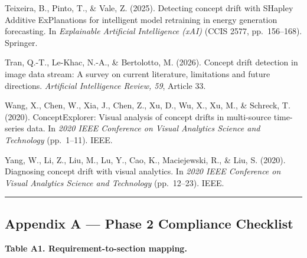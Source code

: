 \documentclass[
]{article}
\begin{document}
Teixeira, B., Pinto, T., \& Vale, Z. (2025). Detecting concept drift
with SHapley Additive ExPlanations for intelligent model retraining in
energy generation forecasting. In \emph{Explainable Artificial
Intelligence (xAI)} (CCIS 2577, pp.~156--168). Springer.

Tran, Q.-T., Le-Khac, N.-A., \& Bertolotto, M. (2026). Concept drift
detection in image data stream: A survey on current literature,
limitations and future directions. \emph{Artificial Intelligence Review,
59}, Article 33.

Wang, X., Chen, W., Xia, J., Chen, Z., Xu, D., Wu, X., Xu, M., \&
Schreck, T. (2020). ConceptExplorer: Visual analysis of concept drifts
in multi-source time-series data. In \emph{2020 IEEE Conference on
Visual Analytics Science and Technology} (pp.~1--11). IEEE.

Yang, W., Li, Z., Liu, M., Lu, Y., Cao, K., Maciejewski, R., \& Liu, S.
(2020). Diagnosing concept drift with visual analytics. In \emph{2020
IEEE Conference on Visual Analytics Science and Technology}
(pp.~12--23). IEEE.

\begin{center}\rule{0.5\linewidth}{0.5pt}\end{center}

\hypertarget{appendix-a-phase-2-compliance-checklist}{%
\subsection{Appendix A --- Phase 2 Compliance
Checklist}\label{appendix-a-phase-2-compliance-checklist}}

\textbf{Table A1. Requirement-to-section mapping.}
\end{document}
